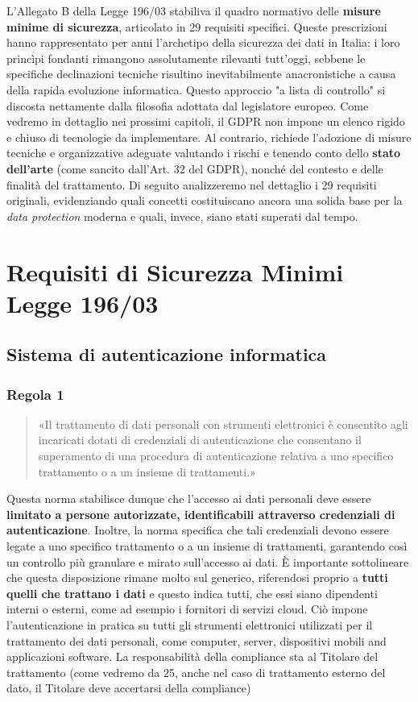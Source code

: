 L'Allegato B della Legge 196/03 stabiliva il quadro normativo delle \textbf{misure minime di sicurezza}, articolato in 29 requisiti specifici.
Queste prescrizioni hanno rappresentato per anni l'archetipo della sicurezza dei dati in Italia: i loro princìpi fondanti rimangono assolutamente rilevanti tutt'oggi, sebbene le specifiche declinazioni tecniche risultino inevitabilmente anacronistiche a causa della rapida evoluzione informatica.
Questo approccio "a lista di controllo" si discosta nettamente dalla filosofia adottata dal legislatore europeo.
Come vedremo in dettaglio nei prossimi capitoli, il GDPR non impone un elenco rigido e chiuso di tecnologie da implementare.
Al contrario, richiede l'adozione di misure tecniche e organizzative adeguate valutando i rischi e tenendo conto dello \textbf{stato dell'arte} (come sancito dall'Art. 32 del GDPR), nonché del contesto e delle finalità del trattamento.
\vspace{0.5cm} 
Di seguito analizzeremo nel dettaglio i 29 requisiti originali, evidenziando quali concetti costituiscano ancora una solida base per la \textit{data protection} moderna e quali, invece, siano stati superati dal tempo.
\section{Requisiti di Sicurezza Minimi Legge 196/03}
\subsection{Sistema di autenticazione informatica}
\subsubsection*{Regola 1}
\begin{quote}
    «Il trattamento di dati personali con strumenti elettronici è consentito agli incaricati dotati di credenziali di autenticazione che consentano il superamento di una procedura di autenticazione relativa a uno specifico trattamento o a un insieme di trattamenti.»
\end{quote}

Questa norma stabilisce dunque che l'accesso ai dati personali deve essere \textbf{limitato a persone autorizzate, identificabili attraverso credenziali di autenticazione}.
Inoltre, la norma specifica che tali credenziali devono essere legate a uno specifico trattamento o a un insieme di trattamenti, garantendo così un controllo più granulare e mirato sull'accesso ai dati.
È importante sottolineare che questa disposizione rimane molto sul generico, riferendosi proprio a \textbf{tutti quelli che trattano i dati} e questo indica tutti, che essi siano dipendenti interni o esterni, come ad esempio i fornitori di servizi cloud.
Ciò impone l'autenticazione in pratica su tutti gli strumenti elettronici utilizzati per il trattamento dei dati personali, come computer, server, dispositivi mobili and applicazioni software.
La responsabilità della compliance sta al Titolare del trattamento (come vedremo da 25, anche nel caso di trattamento esterno del dato, il Titolare deve accertarsi della compliance)
